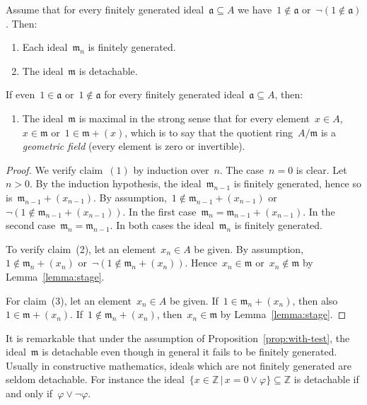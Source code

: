 \documentclass[envcountsect,envcountsame,runningheads]{llncs}
\newcommand{\aaa}{\mathfrak{a}}
\newcommand{\mmm}{\mathfrak{m}}
\newcommand{\ZZ}{\mathbb{Z}}
\renewcommand{\_}{\mathpunct{.}\,}
\begin{document}
\begin{proposition}\label{prop:with-test}
Assume that for every finitely generated ideal~$\aaa \subseteq A$ we have~$1
\not\in \aaa$ or~$\neg(1 \not\in \aaa)$. Then:
\begin{enumerate}
\item Each ideal~$\mmm_n$ is finitely generated.
\item The ideal~$\mmm$ is detachable.
\end{enumerate}
If even~$1 \in \aaa$ or~$1 \not\in \aaa$ for every finitely generated ideal~$\aaa \subseteq
A$, then:
\begin{enumerate}
\addtocounter{enumi}{2}
\item The ideal~$\mmm$ is maximal in the strong sense that for every element~$x
\in A$,~$x \in \mmm$ or~$1 \in \mmm + (x)$, which is to say that the quotient ring~$A/\mmm$ is a
\emph{geometric field} (every element is zero or invertible).
\end{enumerate}
\end{proposition}

\begin{proof}We verify claim~$(1)$ by induction over~$n$. The case~$n = 0$ is
clear. Let~$n > 0$. By the induction hypothesis, the ideal~$\mmm_{n-1}$ is finitely
generated, hence so is~$\mmm_{n-1} + (x_{n-1})$. By assumption,~$1 \not\in \mmm_{n-1} +
(x_{n-1})$ or~$\neg(1 \not\in \mmm_{n-1} + (x_{n-1}))$. In the first
case~$\mmm_n = \mmm_{n-1} + (x_{n-1})$. In the second case~$\mmm_n =
\mmm_{n-1}$. In both cases
the ideal~$\mmm_n$ is finitely generated.

To verify claim~(2), let an element~$x_n \in A$ be given. By assumption,~$1
\not\in \mmm_n + (x_n)$ or~$\neg(1 \not\in \mmm_n + (x_n))$. Hence~$x_n \in
\mmm$ or~$x_n \not\in \mmm$ by Lemma~\ref{lemma:stage}.

For claim~(3), let an element~$x_n \in A$ be given. If~$1 \in \mmm_n + (x_n)$,
then also~$1 \in \mmm + (x_n)$. If~$1 \not\in \mmm_n + (x_n)$, then~$x_n \in
\mmm$ by Lemma~\ref{lemma:stage}.
\end{proof}

It is remarkable that under the assumption of Proposition~\ref{prop:with-test}, the ideal~$\mmm$ is detachable even though in
general it fails to be finitely generated. Usually in constructive mathematics, ideals which are not
finitely generated are seldom detachable. For instance the ideal~$\{ x \in
\ZZ \,|\, x = 0 \vee \varphi \} \subseteq \ZZ$ is detachable if and only
if~$\varphi \vee \neg\varphi$.
\end{document}
